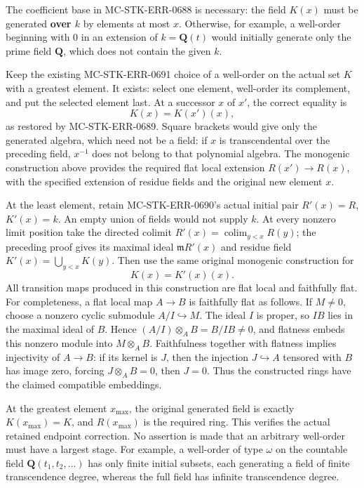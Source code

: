The coefficient base in MC-STK-ERR-0688 is necessary: the field \(K(x)\) must be generated \textbf{over \(k\)} by elements at most \(x\). Otherwise, for example, a well-order beginning with \(0\) in an extension of \(k=\mathbf Q(t)\) would initially generate only the prime field \(\mathbf Q\), which does not contain the given \(k\).

Keep the existing MC-STK-ERR-0691 choice of a well-order on the actual set \(K\) with a greatest element. It exists: select one element, well-order its complement, and put the selected element last. At a successor \(x\) of \(x'\), the correct equality is \[
 K(x)=K(x')(x),
\] as restored by MC-STK-ERR-0689. Square brackets would give only the generated algebra, which need not be a field: if \(x\) is transcendental over the preceding field, \(x^{-1}\) does not belong to that polynomial algebra. The monogenic construction above provides the required flat local extension \(R(x')\to R(x)\), with the specified extension of residue fields and the original new element \(x\).

At the least element, retain MC-STK-ERR-0690's actual initial pair \(R'(x)=R\), \(K'(x)=k\). An empty union of fields would not supply \(k\). At every nonzero limit position take the directed colimit \(R'(x)=\operatorname*{colim}_{y<x}R(y)\); the preceding proof gives its maximal ideal \(\mathfrak mR'(x)\) and residue field \(K'(x)=\bigcup_{y<x}K(y)\). Then use the same original monogenic construction for \[
 K(x)=K'(x)(x).
\] All transition maps produced in this construction are flat local and faithfully flat. For completeness, a flat local map \(A\to B\) is faithfully flat as follows. If \(M\ne0\), choose a nonzero cyclic submodule \(A/I\hookrightarrow M\). The ideal \(I\) is proper, so \(IB\) lies in the maximal ideal of \(B\). Hence \((A/I)\otimes_A B=B/IB\ne0\), and flatness embeds this nonzero module into \(M\otimes_A B\). Faithfulness together with flatness implies injectivity of \(A\to B\): if its kernel is \(J\), then the injection \(J\hookrightarrow A\) tensored with \(B\) has image zero, forcing \(J\otimes_A B=0\), then \(J=0\). Thus the constructed rings have the claimed compatible embeddings.

At the greatest element \(x_{\max}\), the original generated field is exactly \(K(x_{\max})=K\), and \(R(x_{\max})\) is the required ring. This verifies the actual retained endpoint correction. No assertion is made that an arbitrary well-order must have a largest stage. For example, a well-order of type \(\omega\) on the countable field \(\mathbf Q(t_1,t_2,\ldots)\) has only finite initial subsets, each generating a field of finite transcendence degree, whereas the full field has infinite transcendence degree.

